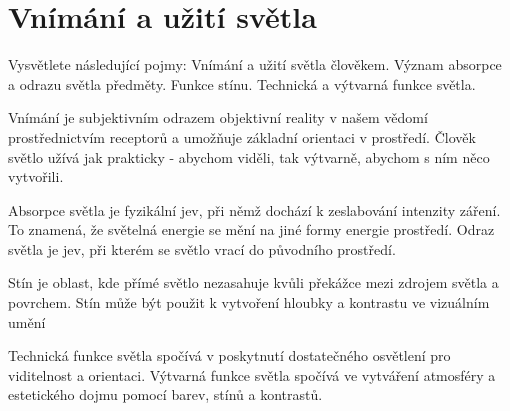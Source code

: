 \section{Vnímání a užití světla}
Vysvětlete následující pojmy: Vnímání a užití světla člověkem. Význam absorpce a odrazu světla předměty. 
Funkce stínu. Technická a výtvarná funkce světla.

Vnímání je subjektivním odrazem objektivní reality v našem vědomí prostřednictvím receptorů a umožňuje základní 
orientaci v prostředí. Člověk světlo užívá jak prakticky - abychom viděli, tak výtvarně, abychom s ním něco vytvořili.

Absorpce světla je fyzikální jev, při němž dochází k zeslabování intenzity záření. To znamená, že světelná energie se 
mění na jiné formy energie prostředí. Odraz světla je jev, při kterém se světlo vrací do původního prostředí.

Stín je oblast, kde přímé světlo nezasahuje kvůli překážce mezi zdrojem světla a povrchem. Stín může být použit k 
vytvoření hloubky a kontrastu ve vizuálním umění

Technická funkce světla spočívá v poskytnutí dostatečného osvětlení pro viditelnost a orientaci. Výtvarná funkce světla 
spočívá ve vytváření atmosféry a estetického dojmu pomocí barev, stínů a kontrastů.